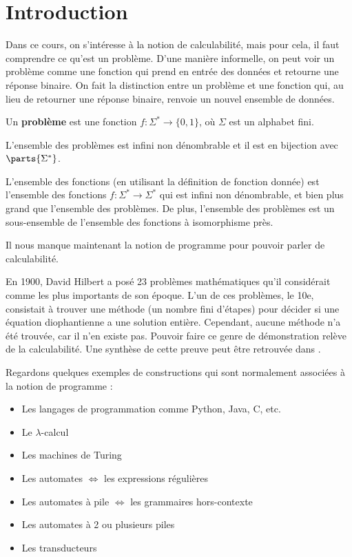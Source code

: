 
\section{Introduction}


Dans ce cours, on s'intéresse à la notion de calculabilité, mais pour cela, il faut comprendre ce qu'est un problème.
D'une manière informelle, on peut voir un problème comme une fonction qui prend en entrée des données et retourne une réponse binaire.
On fait la distinction entre un problème et une fonction qui, au lieu de retourner une réponse binaire, renvoie un nouvel ensemble de données.
\begin{definition}
	Un \textbf{problème} est une fonction $f: \Sigma^* \to \{0, 1\}$, où $\Sigma$ est un alphabet fini.
\end{definition}

\begin{remarque}
	L'ensemble des problèmes est infini non dénombrable et il est en bijection avec $\parts {\Sigma^*}$.
\end{remarque}

\begin{remarque}
	L'ensemble des fonctions (en utilisant la définition de fonction donnée) est l'ensemble des fonctions $f: \Sigma^* \to \Sigma^*$ qui est infini non dénombrable,
	et bien plus grand que l'ensemble des problèmes. De plus, l'ensemble des problèmes est un sous-ensemble de l'ensemble des fonctions à isomorphisme près.
\end{remarque}

Il nous manque maintenant la notion de programme pour pouvoir parler de calculabilité.

En 1900, David Hilbert a posé 23 problèmes mathématiques qu'il considérait comme les plus importants de son époque. L'un de ces problèmes, le 10e, consistait à trouver
une méthode (un nombre fini d'étapes) pour décider si une équation diophantienne a une solution entière. Cependant, aucune méthode n'a été trouvée, car il n'en existe pas.
Pouvoir faire ce genre de démonstration relève de la calculabilité. Une synthèse de cette preuve peut être retrouvée dans \cite{Hilbert10}.

Regardons quelques exemples de constructions qui sont normalement associées à la notion de programme :

\begin{itemize}
	\item Les langages de programmation comme Python, Java, C, etc. 
	\item Le $\lambda$-calcul 
	\item Les machines de Turing 
	\item Les automates $\iff$ les expressions régulières 
	\item Les automates à pile $\iff$ les grammaires hors-contexte 
	\item Les automates à 2 ou plusieurs piles 
	\item Les transducteurs
\end{itemize}

